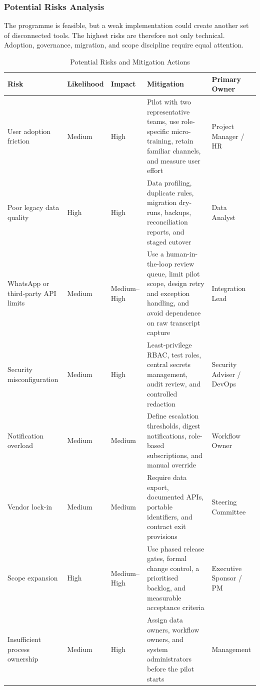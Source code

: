 \documentclass[12pt,a4paper]{report}
\begin{document}
\subsubsection{Potential Risks Analysis}\label{sec:feas-risks}

The programme is feasible, but a weak implementation could create another set of disconnected
tools. The highest risks are therefore not only technical. Adoption, governance, migration, and
scope discipline require equal attention.

\begin{table}[H]
\centering
\caption{Potential Risks and Mitigation Actions}
\label{tab:risk-analysis}
\scriptsize
\renewcommand{\arraystretch}{1.22}
\begin{tabularx}{\textwidth}{>{\raggedright\arraybackslash}p{2.7cm}
                                >{\centering\arraybackslash}p{1.65cm}
                                >{\centering\arraybackslash}p{1.45cm}
                                >{\raggedright\arraybackslash}X
                                >{\raggedright\arraybackslash}p{2.3cm}}
\toprule
\textbf{Risk} & \textbf{Likelihood} & \textbf{Impact} & \textbf{Mitigation} & \textbf{Primary Owner} \\
\midrule
User adoption friction & Medium & High & Pilot with two representative teams, use role-specific micro-training, retain familiar channels, and measure user effort & Project Manager / HR \\
Poor legacy data quality & High & High & Data profiling, duplicate rules, migration dry-runs, backups, reconciliation reports, and staged cutover & Data Analyst \\
WhatsApp or third-party API limits & Medium & Medium--High & Use a human-in-the-loop review queue, limit pilot scope, design retry and exception handling, and avoid dependence on raw transcript capture & Integration Lead \\
Security misconfiguration & Medium & High & Least-privilege RBAC, test roles, central secrets management, audit review, and controlled redaction & Security Adviser / DevOps \\
Notification overload & Medium & Medium & Define escalation thresholds, digest notifications, role-based subscriptions, and manual override & Workflow Owner \\
Vendor lock-in & Medium & Medium & Require data export, documented APIs, portable identifiers, and contract exit provisions & Steering Committee \\
Scope expansion & High & Medium--High & Use phased release gates, formal change control, a prioritised backlog, and measurable acceptance criteria & Executive Sponsor / PM \\
Insufficient process ownership & Medium & High & Assign data owners, workflow owners, and system administrators before the pilot starts & Management \\
\bottomrule
\end{tabularx}
\end{table}
\end{document}
